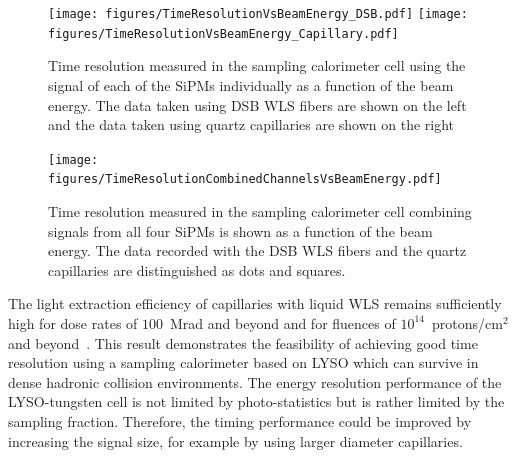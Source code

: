 %
\begin{figure}[htb]
\texttt{[image: figures/TimeResolutionVsBeamEnergy\_DSB.pdf]}
\texttt{[image: figures/TimeResolutionVsBeamEnergy\_Capillary.pdf]}
\caption{\label{TimeResolutionVsEnergy} Time resolution measured in the sampling calorimeter cell using the signal of each 
of the SiPMs individually as a function of the beam energy. The data taken using DSB WLS fibers are shown on
the left and the data taken using quartz capillaries are shown on the right}
\end{figure}
%

%
\begin{figure}[htb]
\texttt{[image: figures/TimeResolutionCombinedChannelsVsBeamEnergy.pdf]}
\caption{\label{TimeResolutionCombined}  Time resolution measured in the sampling calorimeter cell combining signals from all four  
SiPMs is shown as a function of the beam energy.  The data recorded with the DSB WLS fibers and the
quartz capillaries are distinguished as dots and squares.}
\end{figure}
%


The light extraction efficiency of capillaries with liquid WLS remains
sufficiently high for dose rates of $100$~Mrad and beyond and for fluences of
$10^{14}$~protons/$\mathrm{cm}^{2}$ and beyond~\cite{shashlik2}. This result
demonstrates the feasibility of achieving good time resolution using a sampling
calorimeter based on LYSO which can survive in dense hadronic collision environments.
The energy resolution performance of the LYSO-tungsten cell is not limited by
photo-statistics but is rather limited by the sampling fraction. Therefore, the timing
performance could be improved by increasing the signal size, for example by 
using larger diameter capillaries.\\ 

